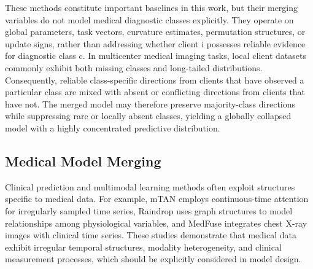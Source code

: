 \documentclass[letterpaper]{article} %
\begin{document}
These methods constitute important baselines in this work, but their merging variables do not model medical diagnostic classes explicitly. They operate on global parameters, task vectors, curvature estimates, permutation structures, or update signs, rather than addressing whether client i possesses reliable evidence for diagnostic class c. In multicenter medical imaging tasks, local client datasets commonly exhibit both missing classes and long-tailed distributions. Consequently, reliable class-specific directions from clients that have observed a particular class are mixed with absent or conflicting directions from clients that have not. The merged model may therefore preserve majority-class directions while suppressing rare or locally absent classes, yielding a globally collapsed model with a highly concentrated predictive distribution.


\subsection{Medical Model Merging}

Clinical prediction and multimodal learning methods often exploit structures specific to medical data. For example, mTAN employs continuous-time attention for irregularly sampled time series\cite{shukla2021multitimeattentionnetworksirregularly}, Raindrop uses graph structures to model relationships among physiological variables\cite{zhang2022graphguidednetworkirregularlysampled}, and MedFuse integrates chest X-ray images with clinical time series\cite{hayat2023medfusemultimodalfusionclinical}. These studies demonstrate that medical data exhibit irregular temporal structures, modality heterogeneity, and clinical measurement processes, which should be explicitly considered in model design.
\end{document}
